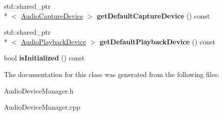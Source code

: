 \begin{DoxyCompactItemize}
\item 
\hypertarget{class_audio_d_x_1_1_audio_device_manager_ad5ce50777b72e0883f26df302f46c0ce}{std\-::shared\-\_\-ptr\\*
$<$ \hyperlink{class_audio_d_x_1_1_audio_capture_device}{Audio\-Capture\-Device} $>$ {\bfseries get\-Default\-Capture\-Device} () const }\label{class_audio_d_x_1_1_audio_device_manager_ad5ce50777b72e0883f26df302f46c0ce}

\item 
\hypertarget{class_audio_d_x_1_1_audio_device_manager_a08361deb5ec1af5a463df7f8919bdcec}{std\-::shared\-\_\-ptr\\*
$<$ \hyperlink{class_audio_d_x_1_1_audio_playback_device}{Audio\-Playback\-Device} $>$ {\bfseries get\-Default\-Playback\-Device} () const }\label{class_audio_d_x_1_1_audio_device_manager_a08361deb5ec1af5a463df7f8919bdcec}

\item 
\hypertarget{class_audio_d_x_1_1_audio_device_manager_aa9f75198d5d0b9442a31cf7006f3bab2}{bool {\bfseries is\-Initialized} () const }\label{class_audio_d_x_1_1_audio_device_manager_aa9f75198d5d0b9442a31cf7006f3bab2}

\end{DoxyCompactItemize}


The documentation for this class was generated from the following files\-:\begin{DoxyCompactItemize}
\item 
Audio\-Device\-Manager.\-h\item 
Audio\-Device\-Manager.\-cpp\end{DoxyCompactItemize}
